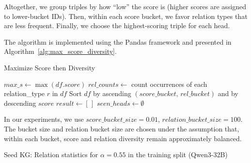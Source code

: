 \documentclass[10pt]{article}
\begin{document}
\begin{appendices}
Altogether, we group triples by how “low” the score is (higher scores are assigned to lower-bucket IDs). Then, within each score bucket, we favor relation types that are less frequent. Finally, we choose the highest-scoring triple for each head.

The algorithm is implemented using the Pandas framework and presented in Algorithm~\ref{alg:max_score_diversity}.
\begin{algorithm}[t]
\caption{Maximize Score then Diversity}
\label{alg:max_score_diversity}
\BlankLine
$max\_s \leftarrow \max(df.score)$\;
$rel\_counts \leftarrow$ count occurrences of each relation\_type $r$ in $df$\;
Sort $df$ by ascending $(score\_bucket,\,rel\_bucket)$ and by descending $score$\;
$result \leftarrow [\,]$\;
$seen\_heads \leftarrow \emptyset$\;
\;
\end{algorithm}

In our experiments, we use $score\_bucket\_size=0.01$, $relation\_bucket\_size=100$. The bucket size and relation bucket size are chosen under the assumption that, within each bucket, score and relation diversity remain approximately balanced.



\begin{table}[t!]
  \centering
  \caption{Seed KG: Relation statistics for $\alpha = 0.55$ in the training split (Qwen3-32B)}
  \label{tab:qwen32b_relstats}
  

\end{table}
\end{appendices}
\end{document}
